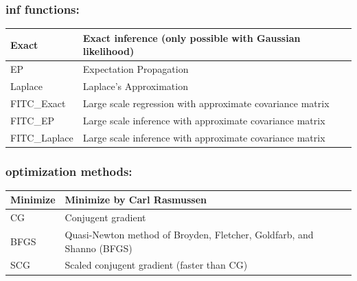 \documentclass[letterpaper,10pt,english]{sphinxmanual}
\begin{document}
\subsubsection{inf functions:}
\label{functionality:inf-functions}
\begin{tabulary}{\linewidth}{|L|L|}
\hline

Exact
 & 
Exact inference (only possible with Gaussian likelihood)
\\\hline

EP
 & 
Expectation Propagation
\\\hline

Laplace
 & 
Laplace's Approximation
\\\hline

FITC\_Exact
 & 
Large scale regression with approximate covariance matrix
\\\hline

FITC\_EP
 & 
Large scale inference  with approximate covariance matrix
\\\hline

FITC\_Laplace
 & 
Large scale inference  with approximate covariance matrix
\\\hline
\end{tabulary}



\subsubsection{optimization methods:}
\label{functionality:optimization-methods}
\begin{tabulary}{\linewidth}{|L|L|}
\hline

Minimize
 & 
Minimize by Carl Rasmussen
\\\hline

CG
 & 
Conjugent gradient
\\\hline

BFGS
 & 
Quasi-Newton method of Broyden, Fletcher, Goldfarb, and Shanno (BFGS)
\\\hline

SCG
 & 
Scaled conjugent gradient (faster than CG)
\\\hline
\end{tabulary}
\end{document}
